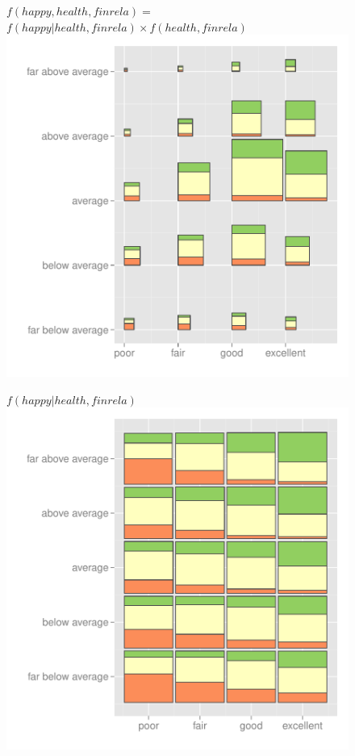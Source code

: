 \documentclass[journal]{vgtc}
\begin{document}
\begin{figure}[htbp]
  \centering
\begin{minipage}[b]{0.32\linewidth}
\centering
$f(happy, health, finrela) =$
$f(happy | health, finrela) \times f(health, finrela)  $
     \includegraphics[width=\linewidth]{part-fluctuation}
 \end{minipage}
%
\begin{minipage}[b]{0.32\linewidth}
\centering
$f(happy | health, finrela)$
    \includegraphics[width=\linewidth]{part-equal-area}

\end{minipage}
\end{figure}
\end{document}
